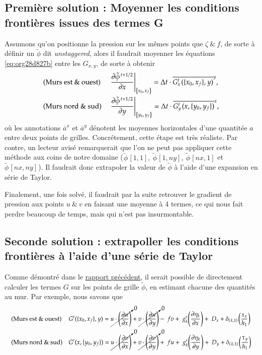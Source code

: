 \documentclass[10pt]{article}
\numberwithin{equation}{section}
\newcommand{\pt}{\hspace{1pt}}
\newcommand{\xmean}[1]{\overline{#1}^x}
\newcommand{\ymean}[1]{\overline{#1}^y}
\begin{document}
\subsection{Première solution : Moyenner les conditions frontières issues des termes G}
\label{sec:org1f81208}

Assumons qu'on positionne la pression sur les mêmes points que \(\zeta\ \& \ f\), de sorte à définir un \(\tilde{\phi}\) dit \emph{unstaggered}, alors il faudrait moyenner les équations \ref{eq:org28d827b} entre les \(G_{x,y}\), de sorte à obtenir
\begin{subequations}
\label{eq:orgc56a364}
\begin{align}
&& &\text{(Murs est \& ouest)}
&&\eval{\pdv{\tilde{\phi}^{\pt t+1/2}}{x}}_\qty{x_0,\pt x_f}
= \Delta t\cdot \ymean{G^t_x\pt (\{x_0,x_f\},y)},&&\\
&& &\text{(Murs nord \& sud)}
&&\eval{\pdv{\tilde{\phi}^{\pt t+1/2}}{y}}_\qty{y_0,\pt y_f}
=  \Delta t\cdot \xmean{G^t_y\pt (x,\{y_0,y_f\})},&&
\end{align}
\end{subequations}
où les annotations \(\xmean{a}\) et \(\ymean{a}\) dénotent les moyennes horizontales d'une quantitée \(a\) entre deux points de grilles.
Concrétement, cette étape est très réaliste.
Par contre, un lecteur avisé remarquerait que l'on ne peut pas appliquer cette méthode aux coins de notre domaine (\(\pt \tilde{\phi}\pt[1,1],\ \tilde{\phi}\pt[1,ny],\ \tilde{\phi}\pt[nx,1]\) et \(\tilde{\phi}\pt[nx,ny]\pt\)).
Il faudrait donc extrapoler la valeur de \(\tilde{\phi}\) à l'aide d'une expansion en série de Taylor.\bigskip

Finalement, une fois solvé, il faudrait par la suite retrouver le gradient de pression aux points \(u\ \&\ v\) en faisant une moyenne à 4 termes, ce qui nous fait perdre beaucoup de temps, mais qui n'est pas insurmontable.

\subsection{Seconde solution : extrapoller les conditions frontières à l'aide d'une série de Taylor}
\label{sec:orgf62fc14}
Comme démontré dans le \href{rapport-2023-04-21.org}{rapport précédent}, il serait possible de directement calculer les termes \(G\) sur les points de grille \(\tilde{\phi}\), en estimant chacune des quantités au mur.
Par exemple, nous savons que 
\begin{subequations}
\begin{align}
&& &\text{(Murs est \& ouest)}&&
G^t(\{x_0,x_f\},y) =
\cancelto{0}{u \cdot \qty(\pdv{u}{x})} + \cancelto{0}{v \cdot \qty(\pdv{u}{y})}
-\ fv
+\ g'_{k} \qty(\pdv{\eta_k}{x})
+\ D_x
+\delta_\qty(\pt k,1)\pt \qty(\frac{\tau_x}{h_1})&&\\
%
&& &\text{(Murs nord \& sud)} &&
G^t(x,\{y_0,y_f\}) =
\cancelto{0}{u \cdot \qty(\pdv{v}{x})} + \cancelto{0}{v \cdot \qty(\pdv{v}{y})}
+\ fu
+\ g'_{k} \qty(\pdv{\eta_k}{y})
+\ D_y
+\delta_\qty(\pt k,1)\pt \qty(\frac{\tau_y}{h_1})&&
\end{align}
\end{subequations}
\end{document}
